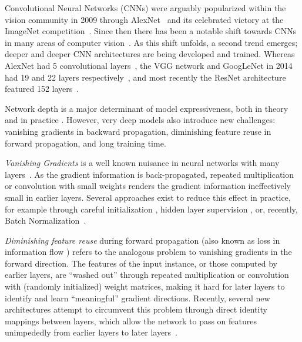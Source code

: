
Convolutional Neural Networks (CNNs) were arguably popularized within the vision community in 2009 through AlexNet~\cite{krizhevsky2009learning} and its celebrated victory at the ImageNet competition~\cite{deng2009imagenet}.
Since then there has been a notable shift towards CNNs in many areas of computer vision~\cite{krizhevsky2012imagenet,sermanet2013overfeat,simonyan2014very,springenberg2014striving,szegedy2015going,he2015deep}. As this shift unfolds, a second trend emerges; deeper and deeper CNN architectures are being developed and trained. Whereas AlexNet had 5 convolutional layers~\cite{krizhevsky2009learning}, the VGG network and GoogLeNet in 2014 had 19 and 22 layers respectively~\cite{simonyan2014very,szegedy2015going}, and most recently the ResNet architecture featured 152 layers~\cite{he2015deep}.

Network depth is a major determinant of model expressiveness, both in theory \cite{haastad1991power,haastad1987computational} and in practice \cite{he2015deep,simonyan2014very,szegedy2015going}. However, very deep models also introduce new challenges: vanishing gradients in backward propagation, diminishing feature reuse in forward propagation, and long training time.

\emph{Vanishing Gradients} is a well known nuisance in neural networks with many layers~\cite{bengio1994learning}. As the gradient information is back-propagated, repeated multiplication or convolution with small weights renders the gradient information ineffectively small in earlier layers. Several approaches exist to reduce this effect in practice, for example through careful initialization \cite{glorot2010understanding}, hidden layer supervision \cite{lee2014deeply}, or, recently, Batch Normalization~\cite{ioffe2015batch}.

\emph{Diminishing feature reuse} during forward propagation (also known as loss in information flow \cite{srivastava2015highway}) refers to the analogous problem to vanishing gradients in the forward direction. The features of the input instance, or those computed by earlier layers, are ``washed out'' through repeated multiplication or convolution with (randomly initialized) weight matrices, making it hard for later layers to identify and learn ``meaningful'' gradient directions. Recently, several new architectures attempt to circumvent this problem through direct identity mappings between layers, which allow the network to pass on features unimpededly from earlier layers to later layers~\cite{he2015deep,srivastava2015highway}.

